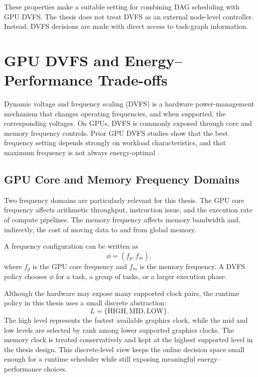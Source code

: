 These properties make \CUDASTF{} a suitable setting for combining DAG scheduling with GPU DVFS. The thesis does not treat DVFS as an external node-level controller. Instead, DVFS decisions are made with direct access to task-graph information.

\section{GPU DVFS and Energy--Performance Trade-offs}
\label{sec:theory_dvfs}

Dynamic voltage and frequency scaling (DVFS) is a hardware power-management mechanism that changes operating frequencies, and when supported, the corresponding voltages. On GPUs, DVFS is commonly exposed through core and memory frequency controls. Prior GPU DVFS studies show that the best frequency setting depends strongly on workload characteristics, and that maximum frequency is not always energy-optimal \cite{Mei2017Survey,Ali2022Optimal,Ali2023Portable,Guerreiro2018PowerModeling,Guerreiro2019CrossDomain,Wang2020FreqScaling,Wang2024DSO}.

\subsection{GPU Core and Memory Frequency Domains}
\label{subsec:core_memory_frequency}

Two frequency domains are particularly relevant for this thesis. The GPU core frequency affects arithmetic throughput, instruction issue, and the execution rate of compute pipelines. The memory frequency affects memory bandwidth and, indirectly, the cost of moving data to and from global memory.

A frequency configuration can be written as
\begin{equation}
\phi = (f_g, f_m),
\label{eq:frequency_config}
\end{equation}
where $f_g$ is the GPU core frequency and $f_m$ is the memory frequency. A DVFS policy chooses $\phi$ for a task, a group of tasks, or a larger execution phase.

Although the hardware may expose many supported clock pairs, the runtime policy in this thesis uses a small discrete abstraction:
\begin{equation}
L = \{\mathrm{HIGH},\mathrm{MID},\mathrm{LOW}\}.
\label{eq:dvfs_levels}
\end{equation}
The high level represents the fastest available graphics clock, while the mid and low levels are selected by rank among lower supported graphics clocks. The memory clock is treated conservatively and kept at the highest supported level in the thesis design. This discrete-level view keeps the online decision space small enough for a runtime scheduler while still exposing meaningful energy--performance choices.

